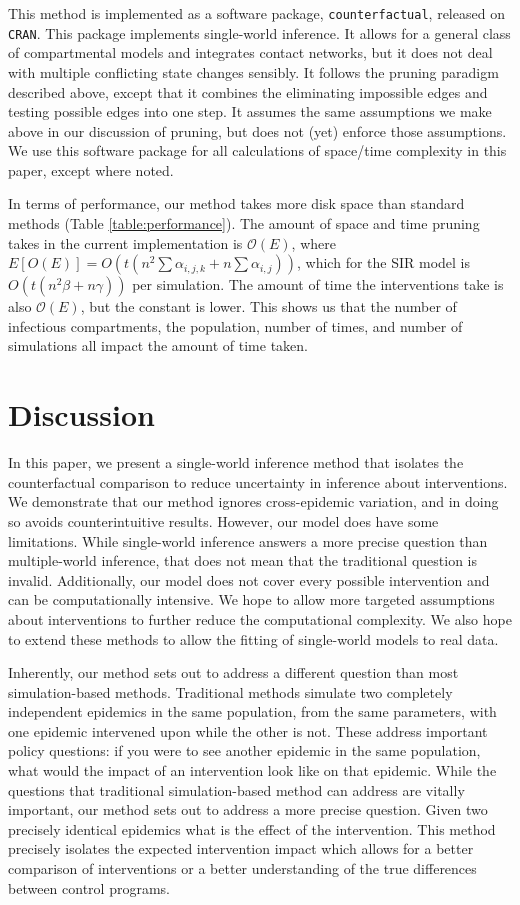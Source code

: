 \documentclass[openacc]{rsproca_new}%
\begin{document}
This method is implemented as a software package, \texttt{counterfactual}, released on \texttt{CRAN}. %
This package implements single-world inference. 
It allows for a general class of compartmental models and integrates contact networks, but it does not deal with multiple conflicting state changes sensibly.
It follows the pruning paradigm described above, except that it combines the eliminating impossible edges and testing possible edges into one step.
It assumes the same assumptions we make above in our discussion of pruning, but does not (yet) enforce those assumptions.
We use this software package for all calculations of space/time complexity in this paper, except where noted.

In terms of performance, our method takes more disk space than standard methods (Table \ref{table:performance}).
The amount of space and time pruning takes in the current implementation is $\mathcal O(E)$, where $E[O(E)] = O(t(n^2\sum \alpha_{i,j,k} + n \sum\alpha_{i,j}))$, which for the SIR model is $O(t(n^2\beta + n\gamma))$ per simulation.
The amount of time the interventions take is also $\mathcal O(E)$, but the constant is lower.
This shows us that the number of infectious compartments, the population, number of times, and number of simulations all impact the amount of time taken.

\section{Discussion}
In this paper, we present a single-world inference method that isolates the counterfactual comparison to reduce uncertainty in inference about interventions.
We demonstrate that our method ignores cross-epidemic variation, and in doing so avoids counterintuitive results.
However, our model does have some limitations.
While single-world inference answers a more precise question than multiple-world inference, that does not mean that the traditional question is invalid.
Additionally, our model does not cover every possible intervention and can be computationally intensive.
We hope to allow more targeted assumptions about interventions to further reduce the computational complexity.
We also hope to extend these methods to allow the fitting of single-world models to real data.

Inherently, our method sets out to address a different question than most simulation-based methods.
Traditional methods simulate two completely independent epidemics in the same population, from the same parameters, with one epidemic intervened upon while the other is not. %
These address important policy questions: if you were to see another epidemic in the same population, what would the impact of an intervention look like on that epidemic.
While the questions that traditional simulation-based method can address are vitally important, our method sets out to address a more precise question.
Given two precisely identical epidemics what is the effect of the intervention. This method precisely isolates the expected intervention impact which allows for a better comparison of interventions or a better understanding of the true differences between control programs. 
\end{document}
